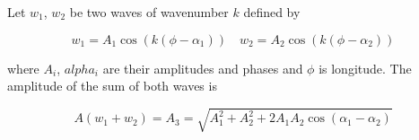 \documentclass[draft,linenumbers]{agujournal2018}
\begin{document}
Let \(w_1\), \(w_2\) be two waves of wavenumber \(k\) defined by

\begin{linenomath*}
\begin{equation}
w_1 = A_1\cos(k(\phi - \alpha_1)) \quad
w_2 = A_2\cos(k(\phi - \alpha_2)) 
\end{equation}
\end{linenomath*}

where \(A_i\), \(alpha_i\) are their amplitudes and phases and \(\phi\)
is longitude. The amplitude of the sum of both waves is

\begin{linenomath*}
\begin{equation}
A(w_1 + w_2) = A_3 = \sqrt{A_1^2 + A_2^2 + 2A_1A_2\cos(\alpha_1 - \alpha_2)}
\end{equation}
\end{linenomath*}


\end{document}
